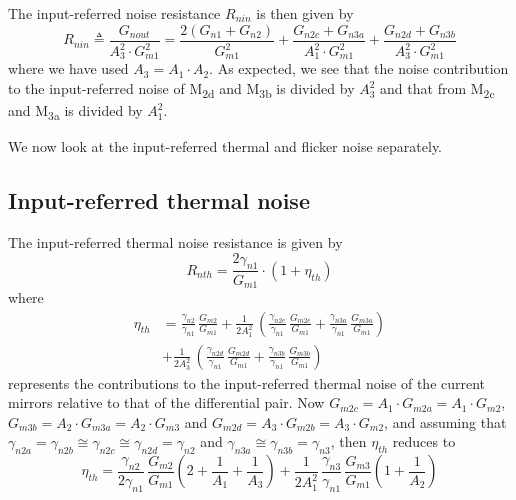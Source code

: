 \documentclass[
  a4paper,
  DIV=11,
  numbers=noendperiod]{scrreprt}
\begin{document}
The input-referred noise resistance \(R_{nin}\) is then given by
\begin{equation}
  R_{nin} \triangleq \frac{G_{nout}}{A_3^2 \cdot G_{m1}^2} = \frac{2(G_{n1}+G_{n2})}{G_{m1}^2} + \frac{G_{n2c}+G_{n3a}}{A_1^2 \cdot G_{m1}^2} + \frac{G_{n2d}+G_{n3b}}{A_3^2 \cdot G_{m1}^2}
\end{equation} where we have used \(A_3=A_1 \cdot A_2\). As expected, we
see that the noise contribution to the input-referred noise of
M\textsubscript{2d} and M\textsubscript{3b} is divided by \(A_3^2\) and
that from M\textsubscript{2c} and M\textsubscript{3a} is divided by
\(A_1^2\).

We now look at the input-referred thermal and flicker noise separately.

\subsection{Input-referred thermal
noise}\label{input-referred-thermal-noise}

The input-referred thermal noise resistance is given by \begin{equation}
  R_{nth} = \frac{2 \gamma_{n1}}{G_{m1}} \cdot (1 + \eta_{th})
\end{equation} where \begin{align}
  \eta_{th} &= \frac{\gamma_{n2}}{\gamma_{n1}}\,\frac{G_{m2}}{G_{m1}} + \frac{1}{2 A_1^2}\,\left(\frac{\gamma_{n2c}}{\gamma_{n1}}\,\frac{G_{m2c}}{G_{m1}} + \frac{\gamma_{n3a}}{\gamma_{n1}}\,\frac{G_{m3a}}{G_{m1}}\right)\\
  &+\frac{1}{2 A_3^2}\,\left(\frac{\gamma_{n2d}}{\gamma_{n1}}\,\frac{G_{m2d}}{G_{m1}} +\frac{\gamma_{n3b}}{\gamma_{n1}}\,\frac{G_{m3b}}{G_{m1}}\right)
\end{align} represents the contributions to the input-referred thermal
noise of the current mirrors relative to that of the differential pair.
Now \(G_{m2c}=A_1 \cdot G_{m2a}=A_1 \cdot G_{m2}\),
\(G_{m3b}=A_2 \cdot G_{m3a}=A_2 \cdot G_{m3}\) and
\(G_{m2d}=A_3 \cdot G_{m2b} = A_3 \cdot G_{m2}\), and assuming that
\(\gamma_{n2a}=\gamma_{n2b}\cong\gamma_{n2c}\cong\gamma_{n2d}=\gamma_{n2}\)
and \(\gamma_{n3a}\cong\gamma_{n3b}=\gamma_{n3}\), then \(\eta_{th}\)
reduces to \begin{equation}
  \eta_{th} = \frac{\gamma_{n2}}{2\gamma_{n1}}\,\frac{G_{m2}}{G_{m1}} \left(2+\frac{1}{A_1}+\frac{1}{A_3}\right) +\frac{1}{2 A_1^2}\,\frac{\gamma_{n3}}{\gamma_{n1}}\,\frac{G_{m3}}{G_{m1}} \left(1+\frac{1}{A_2}\right)
\end{equation}
\end{document}
